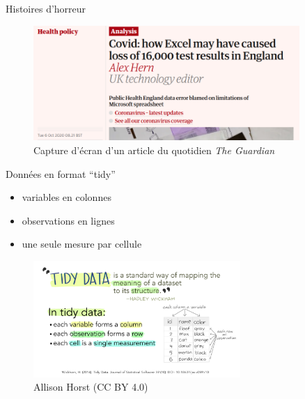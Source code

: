 \documentclass[
  ignorenonframetext,
]{beamer}
\providecommand{\tightlist}{%
  \setlength{\itemsep}{0pt}\setlength{\parskip}{0pt}}\usepackage{longtable,booktabs,array}
\begin{document}
\begin{frame}{Histoires d'horreur}
\protect\hypertarget{histoires-dhorreur}{}
\begin{figure}

{\centering \includegraphics[width=0.9\textwidth,height=\textheight]{figures/guardian-covid-excel.png}

}

\caption{Capture d'écran d'un article du quotidien \emph{The Guardian}}

\end{figure}
\end{frame}

\begin{frame}{Données en format ``tidy''}
\protect\hypertarget{donnuxe9es-en-format-tidy}{}
\begin{itemize}
\tightlist
\item
  variables en colonnes
\item
  observations en lignes
\item
  une seule mesure par cellule
\end{itemize}

\begin{figure}

{\centering \includegraphics[width=0.7\textwidth,height=\textheight]{figures/tidydata_1.jpg}

}

\caption{Allison Horst (CC BY 4.0)}

\end{figure}
\end{frame}
\end{document}
